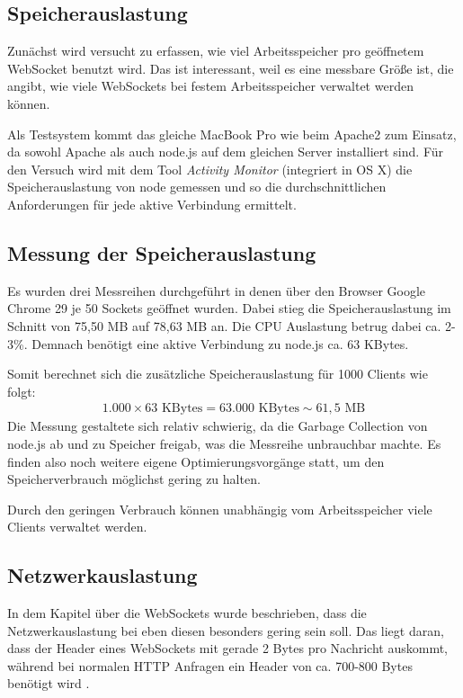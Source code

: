 \subsection{Speicherauslastung}
Zunächst wird versucht zu erfassen, wie viel Arbeitsspeicher pro geöffnetem WebSocket benutzt wird. Das ist interessant, weil es eine messbare Größe ist, die angibt, wie viele WebSockets bei festem Arbeitsspeicher verwaltet werden können.\par

Als Testsystem kommt das gleiche MacBook Pro wie beim Apache2 zum Einsatz, da sowohl Apache als auch node.js auf dem gleichen Server installiert sind. Für den Versuch wird mit dem Tool \emph{Activity Monitor} (integriert in OS X) die Speicherauslastung von node gemessen und so die durchschnittlichen Anforderungen für jede aktive Verbindung ermittelt.

\subsection{Messung der Speicherauslastung}
Es wurden drei Messreihen durchgeführt in denen über den Browser Google Chrome 29 je 50 Sockets geöffnet wurden. Dabei stieg die Speicherauslastung im Schnitt von 75,50 MB auf 78,63 MB an. Die CPU Auslastung betrug dabei ca. 2-3\%. Demnach benötigt eine aktive Verbindung zu node.js ca. 63 KBytes.\par

Somit berechnet sich die zusätzliche Speicherauslastung für 1000 Clients wie folgt:
\begin{align*}
	1.000 \times 63 \mbox{ KBytes} = 63.000 \mbox{ KBytes} \sim 61,5 \mbox{ MB}
\end{align*}
Die Messung gestaltete sich relativ schwierig, da die Garbage Collection von node.js ab und zu Speicher freigab, was die Messreihe unbrauchbar machte. Es finden also noch weitere eigene Optimierungsvorgänge statt, um den Speicherverbrauch möglichst gering zu halten.\par

Durch den geringen Verbrauch können unabhängig vom Arbeitsspeicher viele Clients verwaltet werden.

\subsection{Netzwerkauslastung}
In dem Kapitel über die WebSockets wurde beschrieben, dass die Netzwerkauslastung bei eben diesen besonders gering sein soll. Das liegt daran, dass der Header eines WebSockets mit gerade 2 Bytes pro Nachricht auskommt, während bei normalen HTTP Anfragen ein Header von ca. 700-800 Bytes benötigt wird \cite{chromium:headers}.\par

